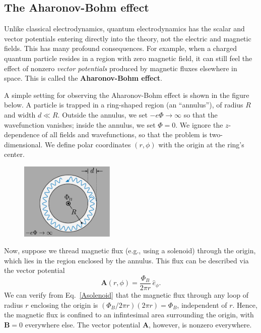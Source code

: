 \documentclass[pra,12pt]{revtex4}
\begin{document}
\subsection{The Aharonov-Bohm effect}

Unlike classical electrodynamics, quantum electrodynamics has the
scalar and vector potentials entering directly into the theory, not
the electric and magnetic fields.  This has many profound
consequences.  For example, when a charged quantum particle resides in
a region with zero magnetic field, it can still feel the effect of
nonzero \textit{vector potentials} produced by magnetic fluxes
elsewhere in space.  This is called the \textbf{Aharonov-Bohm effect}.

A simple setting for observing the Aharonov-Bohm effect is shown in
the figure below.  A particle is trapped in a ring-shaped region (an
``annulus''), of radius $R$ and width $d \ll R$.  Outside the annulus,
we set $-e\Phi\rightarrow\infty$ so that the wavefunction vanishes;
inside the annulus, we set $\Phi = 0$.  We ignore the $z$-dependence
of all fields and wavefunctions, so that the problem is
two-dimensional.  We define polar coordinates $(r,\phi)$ with the
origin at the ring's center.

\begin{figure}[h]
  \centering\includegraphics[width=0.4\textwidth]{annulus}
\end{figure}

Now, suppose we thread magnetic flux (e.g., using a solenoid) through
the origin, which lies in the region enclosed by the annulus.  This
flux can be described via the vector potential
\begin{equation}
  \mathbf{A}(r,\phi) = \frac{\Phi_B}{2\pi r} \, \hat{e}_\phi.
  \label{Asolenoid}
\end{equation}
We can verify from Eq.~\eqref{Asolenoid} that the magnetic flux
through any loop of radius $r$ enclosing the origin is $(\Phi_B/2\pi
r)(2\pi r) = \Phi_B$, independent of $r$.  Hence, the magnetic flux is
confined to an infintesimal area surrounding the origin, with
$\mathbf{B} = 0$ everywhere else. The vector potential $\mathbf{A}$,
however, is nonzero everywhere.
\end{document}
